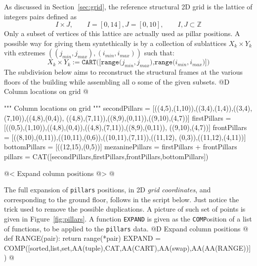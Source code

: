 \documentclass[11pt,oneside]{article}    %
\def\Z{\mathbb{Z}}
\begin{document}
As discussed in Section~\ref{sec:grid}, the reference structural 2D grid is the lattice of integers pairs defined as 
\[
I \times J, \qquad I = [0,14], J = [0,10], \qquad I,J \subset \Z
\]
Only a subset of vertices of this lattice are actually used as pillar positions. A possible way for giving them syntethically is by a collection of sublattices $X_k\times Y_k$ vith extremes $((j_{min},j_{max}),(i_{min},i_{max}))$ such that:
\[
X_k\times Y_k := \texttt{CART([range($j_{min},j_{max}$),range($i_{min},i_{max}$)])}
\]
The subdivision below aims to reconstruct the structural frames at the various floors of the building while assembling all o some of the given subsets.
@D Column locations on grid @{
""" Column locations on grid """
secondPillars = [((4,5),(1,10)),((3,4),(1,4)),((3,4),(7,10)),((4,8),(0,4)),
    ((4,8),(7,11)),((8,9),(0,11)),((9,10),(4,7))]
firstPillars = [((0,5),(1,10)),((4,8),(0,4)),((4,8),(7,11)),((8,9),(0,11)),
    ((9,10),(4,7))]
frontPillars = [((8,10),(0,11)),((10,11),(0,6)),((10,11),(7,11)),((11,12),
    (0,3)),((11,12),(4,11))]
bottomPillars = [((12,15),(0,5))]
mezaninePillars = firstPillars + frontPillars
pillars = CAT([secondPillars,firstPillars,frontPillars,bottomPillars])

@< Expand column positions @>
@}
The full expansion of \texttt{pillars} positions, in 2D \emph{grid coordinates}, and corresponding to the ground floor, follows in the script below. Just notice the trick used to remove the possible duplications. A picture of such set of points is given in Figure~\ref{fig:pillars}.
A function \texttt{EXPAND} is given as the \texttt{COMP}osition of a list of functions, to be applied to the \texttt{pillars} data.
@D Expand column positions  @{
def RANGE(pair): 
    return range(*pair)
EXPAND = COMP([sorted,list,set,AA(tuple),CAT,AA(CART),AA(swap),AA(AA(RANGE))])
@}
\end{document}
